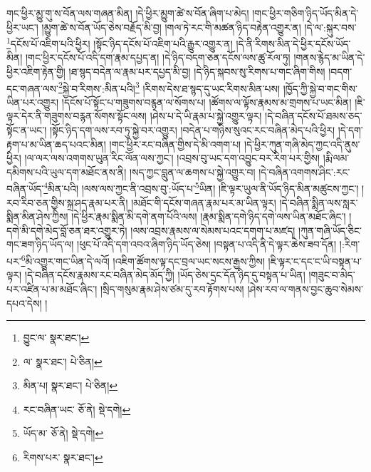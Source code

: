 གང་ཕྱིར་མྱུ་གུ་ས་བོན་ལས་གཞན་མིན། །དེ་ཕྱིར་མྱུག་ཚེ་ས་བོན་ཞིག་པ་མེད། །གང་ཕྱིར་གཅིག་ཉིད་ཡོད་མིན་དེ་ཕྱིར་ཡང་། །མྱུག་ཚེ་ས་བོན་ཡོད་ཅེས་བརྗོད་མི་བྱ། །གལ་ཏེ་རང་གི་མཚན་ཉིད་བརྟེན་འགྱུར་ན། །དེ་ལ་:སྐུར་བས་\footnote{བྱུང་ལ་  སྣར་ཐང་། }དངོས་པོ་འཇིག་པའི་ཕྱིར། །སྟོང་ཉིད་དངོས་པོ་འཇིག་པའི་རྒྱུར་འགྱུར་ན། །དེ་ནི་རིགས་མིན་དེ་ཕྱིར་དངོས་ཡོད་མིན། །གང་ཕྱིར་དངོས་པོ་འདི་དག་རྣམ་དཔྱད་ན། །དེ་ཉིད་བདག་ཅན་དངོས་ལས་ཚུ་རོལ་ཏུ། །གནས་རྙེད་མ་ཡིན་དེ་ཕྱིར་འཇིག་རྟེན་གྱི། །ཐ་སྙད་བདེན་ལ་རྣམ་པར་དཔྱད་མི་བྱ། །དེ་ཉིད་སྐབས་སུ་རིགས་པ་གང་ཞིག་གིས། །བདག་དང་གཞན་ལས་\footnote{ལ་  སྣར་ཐང་།  པེ་ཅིན། }སྐྱེ་བ་རིགས་:མིན་པའི།\footnote{མིན་པ།  སྣར་ཐང་།  པེ་ཅིན། } །རིགས་དེས་ཐ་སྙད་དུ་ཡང་རིགས་མིན་པས། །ཁྱོད་ཀྱི་སྐྱེ་བ་གང་གིས་ཡིན་པར་འགྱུར། །དངོས་པོ་སྟོང་པ་གཟུགས་བརྙན་ལ་སོགས་པ། །ཚོགས་ལ་ལྟོས་རྣམས་མ་གྲགས་པ་ཡང་མིན། །ཇི་ལྟར་དེར་ནི་གཟུགས་བརྙན་སོགས་སྟོང་ལས། །ཤེས་པ་དེ་ཡི་རྣམ་པ་སྐྱེ་འགྱུར་ལྟར། །དེ་བཞིན་དངོས་པོ་ཐམས་ཅད་སྟོང་ན་ཡང་། །སྟོང་ཉིད་དག་ལས་རབ་ཏུ་སྐྱེ་བར་འགྱུར། །བདེན་པ་གཉིས་སུའང་རང་བཞིན་མེད་པའི་ཕྱིར། །དེ་དག་རྟག་པ་མ་ཡིན་ཆད་པའང་མིན། །གང་ཕྱིར་རང་བཞིན་གྱིས་དེ་མི་འགག་པ། །དེ་ཕྱིར་ཀུན་གཞི་མེད་ཀྱང་འདི་ནུས་ཕྱིར། །ལ་ལར་ལས་འགགས་ཡུན་རིང་ལོན་ལས་ཀྱང་། །འབྲས་བུ་ཡང་དག་འབྱུང་བར་རིག་པར་གྱིས། །རྨི་ལམ་དམིགས་པའི་ཡུལ་དག་མཐོང་ནས་ནི། །སད་ཀྱང་བླུན་ལ་ཆགས་པ་སྐྱེ་འགྱུར་བ། །དེ་བཞིན་འགགས་ཤིང་:རང་བཞིན་ཡོད་\footnote{རང་བཞིན་ཡང་  ཅོ་ནེ།  སྡེ་དགེ། }མིན་པའི། །ལས་ལས་ཀྱང་ནི་འབྲས་བུ་:ཡོད་པ་\footnote{ཡོད་མ་  ཅོ་ནེ།  སྡེ་དགེ། }ཡིན། །ཇི་ལྟར་ཡུལ་ནི་ཡོད་ཉིད་མིན་མཚུངས་ཀྱང་། །རབ་རིབ་ཅན་གྱིས་སྐྲ་ཤད་རྣམ་པར་ནི། །མཐོང་གི་དངོས་གཞན་རྣམ་པར་མ་ཡིན་ལྟར། །དེ་བཞིན་སྨིན་ལས་སླར་སྨིན་མིན་ཤེས་ཀྱིས། །དེ་ཕྱིར་རྣམ་སྨིན་མི་དགེ་ནག་པོའི་ལས། །རྣམ་སྨིན་དགེ་ཉིད་དགེ་ལས་ཡིན་མཐོང་ཞིང་། །དགེ་མི་དགེ་མེད་བློ་ཅན་ཐར་འགྱུར་ཏེ། །ལས་འབྲས་རྣམས་ལ་སེམས་པའང་དགག་པ་མཛད། །ཀུན་གཞི་ཡོད་ཅིང་གང་ཟག་ཉིད་ཡོད་ལ། །ཕུང་པོ་འདི་དག་འབའ་ཞིག་ཉིད་ཡོད་ཅེས། །བསྟན་པ་འདི་ནི་དེ་ལྟར་ཆེས་ཟབ་དོན། །:རིག་པར་\footnote{རིགས་པར་  སྣར་ཐང་། }མི་འགྱུར་གང་ཡིན་དེ་ལའོ། །འཇིག་ཚོགས་ལྟ་དང་བྲལ་ཡང་སངས་རྒྱས་ཀྱིས། །ཇི་ལྟར་ང་དང་ང་ཡི་བསྟན་པ་ལྟར། །དེ་བཞིན་དངོས་རྣམས་རང་བཞིན་མེད་མོད་ཀྱི། །ཡོད་ཅེས་དྲང་དོན་ཉིད་དུ་བསྟན་པ་ཡིན། །གཟུང་བ་མེད་པར་འཛིན་པ་མ་མཐོང་ཞིང་། །སྲིད་གསུམ་རྣམ་ཤེས་ཙམ་དུ་རབ་རྟོགས་པས། །ཤེས་རབ་ལ་གནས་བྱང་ཆུབ་སེམས་དཔའ་དེས། །
